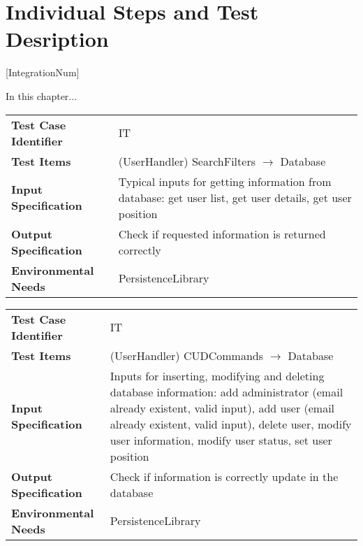 \pagebreak
\section{Individual Steps and Test Desription}

[IntegrationNum]

\newcommand{\Test}[4]{
	\stepcounter{TestNum}
	\begin{center}
		\begin{tabular}{|l p{9 cm}|}
			\hline
			\textbf{Test Case Identifier} & I\arabic{IntegrationNum}T\arabic{TestNum}\\
			\textbf{Test Items} & #1\\
			\textbf{Input Specification} & #2\\
			\textbf{Output Specification} & #3\\
			\textbf{Environmental Needs} & #4\\
			\hline
		\end{tabular}
	\end{center}
}

\newcommand{\Procedure}[2]{
	\stepcounter{ProcNum}
	\begin{center}
		\begin{tabular}{|l l|}
			\hline
			\textbf{Test Procedure Identifier} & P\arabic{ProcNum}\\
			\textbf{Purpose} & #1\\
			\textbf{Procedure Steps} & #2\\
			\hline
		\end{tabular}
	\end{center}
}

In this chapter...


\Test{(UserHandler) SearchFilters $ \rightarrow $ Database}{Typical inputs for getting information from database: get user list, get user details, get user position}{Check if requested information is returned correctly}{PersistenceLibrary}

\Test{(UserHandler) CUDCommands $ \rightarrow $ Database}{Inputs for inserting, modifying and deleting database information: add administrator (email already existent, valid input), add user (email already existent, valid input), delete user, modify user information, modify user status, set user position}{Check if information is correctly update in the database}{PersistenceLibrary}


